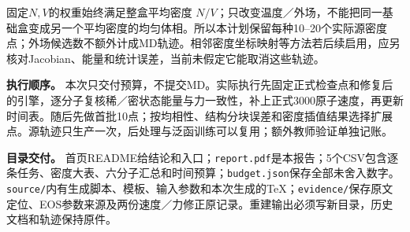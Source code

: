 \documentclass[a4paper]{ctexart}
\begin{document}
固定$N,V$的权重始终满足整盒平均密度 $N/V$；只改变温度／外场，不能把同一基础盒变成另一个平均密度的均匀体相。所以本计划保留每种10--20个实际源密度点；外场候选数不额外计成MD轨迹。相邻密度坐标映射等方法若后续启用，应另核对Jacobian、能量和统计误差，当前未假定它能取消这些轨迹。

\textbf{执行顺序。} 本次只交付预算，不提交MD。实际执行先固定正式检查点和修复后的引擎，逐分子复核稀／密状态能量与力一致性，补上正式3000原子速度，再更新时间表。随后先做首批10点；按均相性、结构分块误差和密度插值结果选择扩展点。源轨迹只生产一次，后处理与泛函训练可以复用；额外教师验证单独记账。

\textbf{目录交付。} 首页README给结论和入口；\texttt{report.pdf}是本报告；5个CSV包含逐条任务、密度大表、六分子汇总和时间预算；\texttt{budget.json}保存全部未舍入数字。\texttt{source/}内有生成脚本、模板、输入参数和本次生成的TeX；\texttt{evidence/}保存原文定位、EOS参数来源及两份速度／力修正原记录。重建输出必须写新目录，历史文档和轨迹保持原件。
\end{document}
